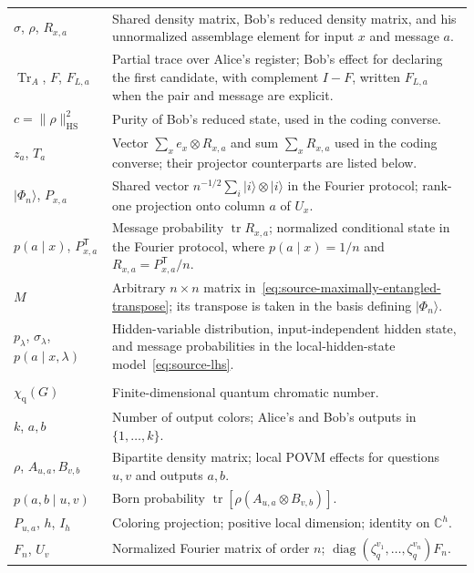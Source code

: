 \documentclass[11pt,a4paper]{article}
\numberwithin{equation}{section}
\numberwithin{figure}{section}
\numberwithin{table}{section}
\numberwithin{footnote}{section}
\theoremstyle{informal}\newtheorem*{informaltheorem}{Informal theorem}
\theoremstyle{definition}\newtheorem{example}{Example}[section]
\theoremstyle{remark}\newtheorem{remark}[theorem]{Remark}
\newcommand{\C}{\mathbb C}
\newcommand{\chq}{\chi_{\mathrm q}}
\newcommand{\tr}{\operatorname{tr}}
\newcommand{\HS}{\mathrm{HS}}
\begin{document}
\begin{longtable}{@{}>{\raggedright\arraybackslash}p{.255\linewidth}>{\raggedright\arraybackslash}p{.70\linewidth}@{}}
\(\sigma\), \(\rho\), \(R_{x,a}\) & Shared density matrix, Bob's reduced density matrix, and his unnormalized assemblage element for input \(x\) and message \(a\).\\
\(\operatorname{Tr}_A\), \(F\), \(F_{L,a}\) & Partial trace over Alice's register; Bob's effect for declaring the first candidate, with complement \(I-F\), written \(F_{L,a}\) when the pair and message are explicit.\\
\(c=\|\rho\|_{\HS}^2\) & Purity of Bob's reduced state, used in the coding converse.\\
\(z_a\), \(T_a\) & Vector \(\sum_x e_x\otimes R_{x,a}\) and sum \(\sum_xR_{x,a}\) used in the coding converse; their projector counterparts are listed below.\\
\(|\Phi_n\rangle\), \(P_{x,a}\) & Shared vector \(n^{-1/2}\sum_i|i\rangle\otimes|i\rangle\) in the Fourier protocol; rank-one projection onto column \(a\) of \(U_x\).\\
\(p(a\mid x)\), \(P_{x,a}^{\mathsf T}\) & Message probability \(\tr R_{x,a}\); normalized conditional state in the Fourier protocol, where \(p(a\mid x)=1/n\) and \(R_{x,a}=P_{x,a}^{\mathsf T}/n\).\\
\(M\) & Arbitrary \(n\times n\) matrix in~\eqref{eq:source-maximally-entangled-transpose}; its transpose is taken in the basis defining \(|\Phi_n\rangle\).\\
\(p_\lambda\), \(\sigma_\lambda\), \(p(a\mid x,\lambda)\) & Hidden-variable distribution, input-independent hidden state, and message probabilities in the local-hidden-state model~\eqref{eq:source-lhs}.\\[3pt]
\multicolumn{2}{@{}l}{\textbf{Quantum strategies (Section~\ref{sec:quantum}, Appendix~\ref{app:normal})}}\\*
\(\chq(G)\) & Finite-dimensional quantum chromatic number.\\
\(k\), \(a,b\) & Number of output colors; Alice's and Bob's outputs in \(\{1,\ldots,k\}\).\\
\(\rho\), \(A_{u,a},B_{v,b}\) & Bipartite density matrix; local POVM effects for questions \(u,v\) and outputs \(a,b\).\\
\(p(a,b\mid u,v)\) & Born probability \(\tr[\rho(A_{u,a}\otimes B_{v,b})]\).\\
\(P_{u,a}\), \(h\), \(I_h\) & Coloring projection; positive local dimension; identity on \(\C^h\).\\
\(F_n\), \(U_v\) & Normalized Fourier matrix of order \(n\); \(\operatorname{diag}(\zeta_q^{v_1},\ldots,\zeta_q^{v_n})F_n\).\\

\end{longtable}
\end{document}
